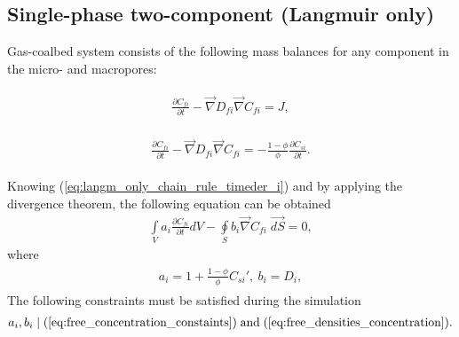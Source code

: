  \subsection*{Single-phase two-component (Langmuir only)}
Gas-coalbed system consists of the following mass balances for any component in the micro- and macropores:

\begin{eqnarray}
\begin{gathered}
\label{eq:langm_only_free_diffusivity_differential}
\frac{\partial C_{fi}}{\partial t} - \vec{\nabla} D_{fi} \vec{\nabla}C_{fi} = J,
\end{gathered}
\end{eqnarray}

\begin{eqnarray}
\begin{gathered}
\label{eq:langm_only_adsorbed_diffusivity_differential}
\frac{\partial C_{fi}}{\partial t} - \vec{\nabla} D_{fi} \vec{\nabla}C_{fi} = - \frac{\mathit{1} - \phi}{\phi} \frac{\partial C_{si}}{\partial t}.
\end{gathered}
\end{eqnarray}

Knowing (\ref{eq:langm_only_chain_rule_timeder_i}) and by applying the divergence theorem, the following equation can be obtained
\begin{eqnarray}
\label{eq:langm_only_diffusivity_simplified_integral}
\int \limits_{V} a_{i} \frac{\partial C_{fi}}{\partial t} dV - \oint \limits_{S} b_{i} \vec{\nabla}C_{fi} \; \vec{dS} = \mathit{0},
\end{eqnarray}
where
\begin{eqnarray}
\begin{gathered}
\label{eq:langm_only_diffusivity_a_b_coeffs}
a_{i}  =  \mathit{1}+\frac{\mathit{1} - \phi}{\phi}C_{si}', \: b_{i}  = D_{i},
\end{gathered}
\end{eqnarray}
The following constraints must be satisfied during the simulation
\begin{eqnarray}
\label{eq:a_b_langm_only_concentration_constaints}
a_{i}, b_{i} \mid (\ref{eq:free_concentration_constaints}) \; \text{and} \; (\ref{eq:free_densities_concentration}).
\end{eqnarray}